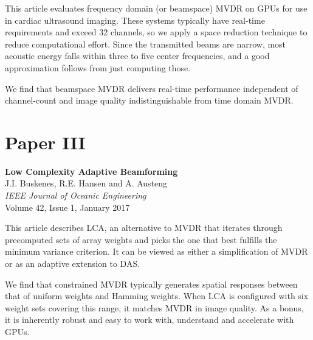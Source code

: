 This article evaluates frequency domain (or beamspace) MVDR on GPUs for use in cardiac ultrasound imaging. These systems typically have real-time requirements and exceed 32 channels, so we apply a space reduction technique to reduce computational effort. Since the transmitted beams are narrow, most acoustic energy falls within three to five center frequencies, and a good approximation follows from just computing those.

We find that beamspace MVDR delivers real-time performance independent of channel-count and image quality indistinguishable from time domain MVDR.


%
%


\section{Paper III}\label{sec:paperIII} %
\textbf{Low Complexity Adaptive Beamforming}~\cite{Buskenes2014}\\
J.I. Buskenes, R.E. Hansen and A. Austeng\\
\textit{IEEE Journal of Oceanic Engineering}\\
Volume 42, Issue 1, January 2017

This article describes LCA, an alternative to MVDR that iterates through precomputed sets of array weights and picks the one that best fulfills the minimum variance criterion. It can be viewed as either a simplification of MVDR or as an adaptive extension to DAS.

We find that constrained MVDR typically generates spatial responses between that of uniform weights and Hamming weights. When LCA is configured with six weight sets covering this range, it matches MVDR in image quality. As a bonus, it is inherently robust and easy to work with, understand and accelerate with GPUs.



